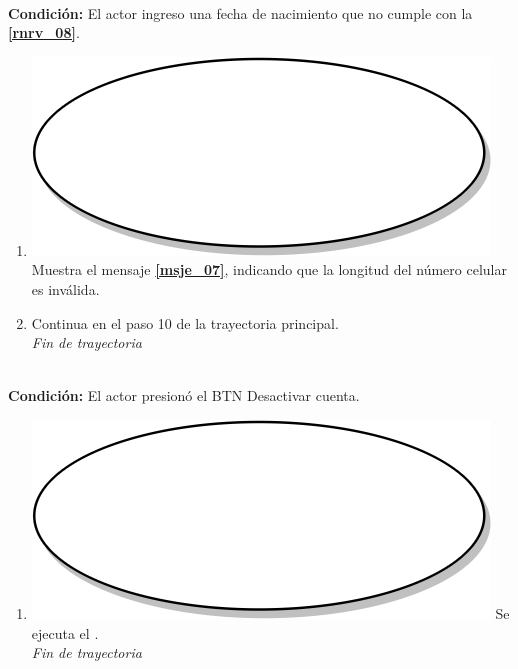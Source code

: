 \textbf{} \\
\textbf{Condición:} El actor ingreso una fecha de nacimiento que no cumple con la \textbf{\ref{rnrv_08}}.\\
 \begin{enumerate}[label=J\arabic*]
    \item {\includegraphics[scale=.05]{Capitulo3/img/proceso.png} Muestra el mensaje \textbf{\ref{msje_07}}, indicando que la longitud del número celular es inválida.}
    \item {Continua en el paso 10 de la trayectoria principal.} \\
    \textit{Fin de trayectoria} \\    
\end{enumerate}

\textbf{} \\
\textbf{Condición:} El actor presionó el BTN Desactivar cuenta. \\
 \begin{enumerate}[label=K\arabic*]
    \item {\includegraphics[scale=.05]{Capitulo3/img/proceso.png} Se ejecuta el \textbf{}.} \\
    \textit{Fin de trayectoria} \\
\end{enumerate}

